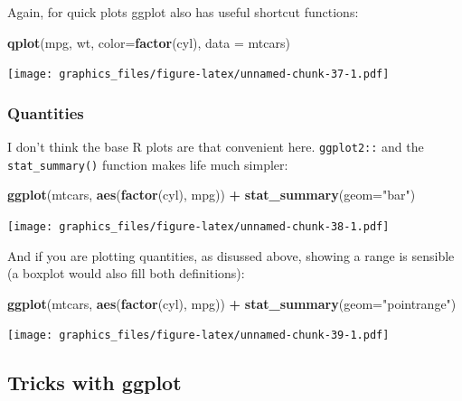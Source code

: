\documentclass[]{article}
\newenvironment{Shaded}{\begin{snugshade}}{\end{snugshade}}
\newcommand{\DataTypeTok}[1]{\textcolor[rgb]{0.13,0.29,0.53}{#1}}
\newcommand{\KeywordTok}[1]{\textcolor[rgb]{0.13,0.29,0.53}{\textbf{#1}}}
\newcommand{\NormalTok}[1]{#1}
\newcommand{\OperatorTok}[1]{\textcolor[rgb]{0.81,0.36,0.00}{\textbf{#1}}}
\newcommand{\StringTok}[1]{\textcolor[rgb]{0.31,0.60,0.02}{#1}}
\begin{document}
Again, for quick plots ggplot also has useful shortcut functions:

\begin{Shaded}
\begin{Highlighting}[]
\KeywordTok{qplot}\NormalTok{(mpg, wt, }\DataTypeTok{color=}\KeywordTok{factor}\NormalTok{(cyl), }\DataTypeTok{data =}\NormalTok{ mtcars)}
\end{Highlighting}
\end{Shaded}

\texttt{[image: graphics\_files/figure-latex/unnamed-chunk-37-1.pdf]}

\hypertarget{quantities}{%
\subsubsection{Quantities}\label{quantities}}

I don't think the base R plots are that convenient here. \texttt{ggplot2::} and the
\texttt{stat\_summary()} function makes life much simpler:

\begin{Shaded}
\begin{Highlighting}[]
\KeywordTok{ggplot}\NormalTok{(mtcars, }\KeywordTok{aes}\NormalTok{(}\KeywordTok{factor}\NormalTok{(cyl), mpg)) }\OperatorTok{+}
\StringTok{  }\KeywordTok{stat_summary}\NormalTok{(}\DataTypeTok{geom=}\StringTok{"bar"}\NormalTok{)}
\end{Highlighting}
\end{Shaded}

\texttt{[image: graphics\_files/figure-latex/unnamed-chunk-38-1.pdf]}

And if you are plotting quantities, as disussed above, showing a range is
sensible (a boxplot would also fill both definitions):

\begin{Shaded}
\begin{Highlighting}[]
\KeywordTok{ggplot}\NormalTok{(mtcars, }\KeywordTok{aes}\NormalTok{(}\KeywordTok{factor}\NormalTok{(cyl), mpg)) }\OperatorTok{+}
\StringTok{  }\KeywordTok{stat_summary}\NormalTok{(}\DataTypeTok{geom=}\StringTok{"pointrange"}\NormalTok{)}
\end{Highlighting}
\end{Shaded}

\texttt{[image: graphics\_files/figure-latex/unnamed-chunk-39-1.pdf]}

\hypertarget{ggplot-details}{%
\subsection*{Tricks with ggplot}\label{ggplot-details}}
\end{document}

